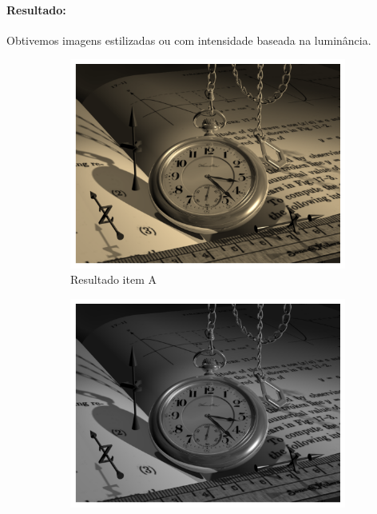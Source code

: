 \documentclass[12pt,a4paper]{report}
\begin{document}
\paragraph{Resultado:} 
Obtivemos imagens estilizadas ou com intensidade baseada na luminância.
\begin{figure}[H]
    \centering
    \begin{subfigure}[b]{0.3\textwidth}
        \includegraphics[width=\textwidth]{imagens/ex5-a.png}
        \caption{Resultado item A }
    \end{subfigure}
    \hfill
    \begin{subfigure}[b]{0.3\textwidth}
        \includegraphics[width=\textwidth]{imagens/ex5-b.png}

\end{subfigure}
\end{figure}
\end{document}
